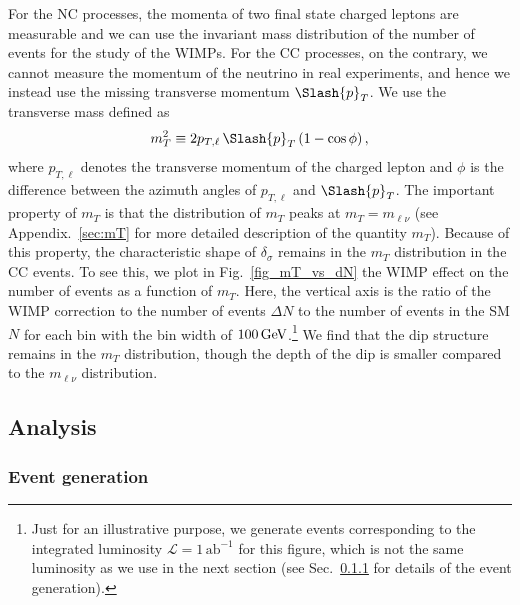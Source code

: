 \documentclass[12pt,twoside,book]{article}
\begin{document}
For the NC processes, the momenta of two final state charged leptons are measurable and we can use the invariant mass distribution of the number of events for the study of the WIMPs.
For the CC processes, on the contrary, we cannot measure the momentum of the neutrino in real experiments, and hence we instead use the missing transverse momentum $\Slash{p}_T$.
We use the transverse mass defined as
\begin{align}
  m_T^2 \equiv 2 p_{T, \ell}\,\Slash{p}_T \left( 1-\cos \phi \right),
\end{align}
where $p_{T, \ell}$ denotes the transverse momentum of the charged lepton and $\phi$ is the difference between the azimuth angles of $p_{T,\ell}$ and $\Slash{p}_T$.
The important property of $m_T$ is that the distribution of $m_T$ peaks at $m_T = m_{\ell\nu}$ (see Appendix.~\ref{sec:mT} for more detailed description of the quantity $m_T$).
Because of this property, the characteristic shape of $\delta_\sigma$ remains in the $m_T$ distribution in the CC events.
To see this, we plot in Fig.~\ref{fig_mT_vs_dN} the WIMP effect on the number of events as a function of $m_T$.
Here, the vertical axis is the ratio of the WIMP correction to the number of events $\Delta N$ to the number of events in the SM $N$ for each bin with the bin width of $100\, {\rm GeV}$.\footnote
{
  Just for an illustrative purpose, we generate events corresponding to the integrated luminosity $\mathcal{L} = 1\,\mathrm{ab}^{-1}$ for this figure, which is not the same luminosity as we use in the next section (see Sec.~\ref{sec_event} for details of the event generation).
}
We find that the dip structure remains in the $m_T$ distribution, though the depth of the dip is smaller compared to the $m_{\ell\nu}$ distribution.


\subsection{Analysis}
\label{sec:analysis}


\subsubsection{Event generation}
\label{sec_event}
\end{document}
